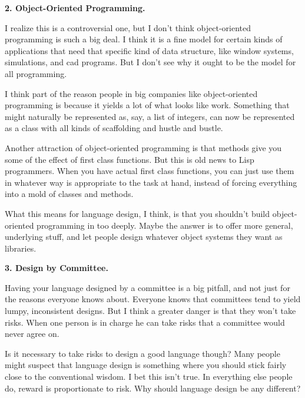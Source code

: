 \textbf{2. Object-Oriented Programming.}

I realize this is a controversial one, but I don't think object-oriented
programming is such a big deal. I think it is a fine model for certain
kinds of applications that need that specific kind of data structure,
like window systems, simulations, and cad programs. But I don't see why
it ought to be the model for all programming.

I think part of the reason people in big companies like object-oriented
programming is because it yields a lot of what looks like work.
Something that might naturally be represented as, say, a list of
integers, can now be represented as a class with all kinds of
scaffolding and hustle and bustle.

Another attraction of object-oriented programming is that methods give
you some of the effect of first class functions. But this is old news to
Lisp programmers. When you have actual first class functions, you can
just use them in whatever way is appropriate to the task at hand,
instead of forcing everything into a mold of classes and methods.

What this means for language design, I think, is that you shouldn't
build object-oriented programming in too deeply. Maybe the answer is to
offer more general, underlying stuff, and let people design whatever
object systems they want as libraries.

\textbf{3. Design by Committee.}

Having your language designed by a committee is a big pitfall, and not
just for the reasons everyone knows about. Everyone knows that
committees tend to yield lumpy, inconsistent designs. But I think a
greater danger is that they won't take risks. When one person is in
charge he can take risks that a committee would never agree on.

Is it necessary to take risks to design a good language though? Many
people might suspect that language design is something where you should
stick fairly close to the conventional wisdom. I bet this isn't true. In
everything else people do, reward is proportionate to risk. Why should
language design be any different?